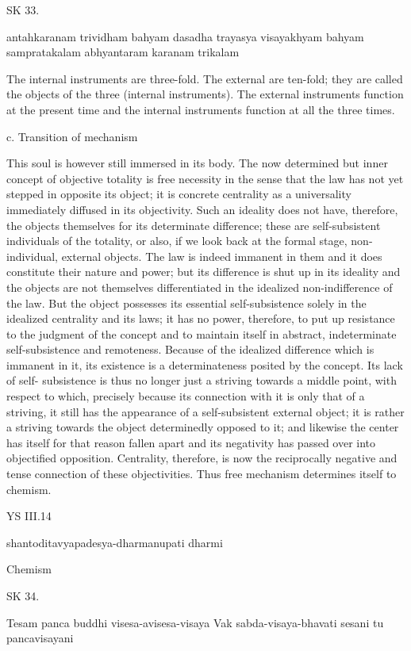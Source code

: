 SK 33.

antahkaranam trividham bahyam dasadha trayasya visayakhyam
bahyam sampratakalam abhyantaram karanam trikalam

The internal instruments are three-fold.
The external are ten-fold; they are called the objects of the three (internal instruments).
The external instruments function at the present time and
the internal instruments function at all the three times.

c. Transition of mechanism

This soul is however still immersed in its body. The now determined but
inner concept of objective totality is free necessity in the sense that the
law has not yet stepped in opposite its object; it is concrete centrality as
a universality immediately diffused in its objectivity. Such an ideality does
not have, therefore, the objects themselves for its determinate difference;
these are self-subsistent individuals of the totality, or also, if we look back
at the formal stage, non-individual, external objects. The law is indeed
immanent in them and it does constitute their nature and power; but
its difference is shut up in its ideality and the objects are not themselves
differentiated in the idealized non-indifference of the law. But the object
possesses its essential self-subsistence solely in the idealized centrality and its
laws; it has no power, therefore, to put up resistance to the judgment of the
concept and to maintain itself in abstract, indeterminate self-subsistence
and remoteness. Because of the idealized difference which is immanent in
it, its existence is a determinateness posited by the concept. Its lack of self-
subsistence is thus no longer just a striving towards a middle point, with
respect to which, precisely because its connection with it is only that of a
striving, it still has the appearance of a self-subsistent external object; it is
rather a striving towards the object determinedly opposed to it; and likewise
the center has itself for that reason fallen apart and its negativity has passed
over into objectified opposition. Centrality, therefore, is now the reciprocally
negative and tense connection of these objectivities. Thus free mechanism
determines itself to chemism.

YS III.14

shantoditavyapadesya-dharmanupati dharmi

Chemism

SK 34.

Tesam panca buddhi visesa-avisesa-visaya
Vak sabda-visaya-bhavati sesani tu pancavisayani

